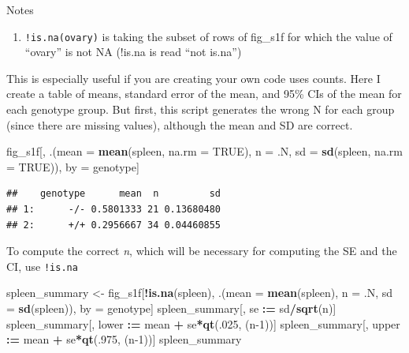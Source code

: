 \documentclass[]{book}
\newenvironment{Shaded}{\begin{snugshade}}{\end{snugshade}}
\newcommand{\DataTypeTok}[1]{\textcolor[rgb]{0.13,0.29,0.53}{#1}}
\newcommand{\DecValTok}[1]{\textcolor[rgb]{0.00,0.00,0.81}{#1}}
\newcommand{\ErrorTok}[1]{\textcolor[rgb]{0.64,0.00,0.00}{\textbf{#1}}}
\newcommand{\KeywordTok}[1]{\textcolor[rgb]{0.13,0.29,0.53}{\textbf{#1}}}
\newcommand{\NormalTok}[1]{#1}
\newcommand{\OperatorTok}[1]{\textcolor[rgb]{0.81,0.36,0.00}{\textbf{#1}}}
\newcommand{\OtherTok}[1]{\textcolor[rgb]{0.56,0.35,0.01}{#1}}
\newcommand{\StringTok}[1]{\textcolor[rgb]{0.31,0.60,0.02}{#1}}
\providecommand{\tightlist}{%
  \setlength{\itemsep}{0pt}\setlength{\parskip}{0pt}}
\begin{document}
Notes

\begin{enumerate}
\def\labelenumi{\arabic{enumi}.}
\tightlist
\item
  \texttt{!is.na(ovary)} is taking the subset of rows of fig\_s1f for which the value of ``ovary'' is not NA (!is.na is read ``not is.na'')
\end{enumerate}

This is especially useful if you are creating your own code uses counts. Here I create a table of means, standard error of the mean, and 95\% CIs of the mean for each genotype group. But first, this script generates the wrong N for each group (since there are missing values), although the mean and SD are correct.

\begin{Shaded}
\begin{Highlighting}[]
\NormalTok{fig_s1f[, .(}\DataTypeTok{mean =} \KeywordTok{mean}\NormalTok{(spleen, }\DataTypeTok{na.rm =} \OtherTok{TRUE}\NormalTok{),}
            \DataTypeTok{n =}\NormalTok{ .N,}
            \DataTypeTok{sd =} \KeywordTok{sd}\NormalTok{(spleen, }\DataTypeTok{na.rm =} \OtherTok{TRUE}\NormalTok{)),}
\NormalTok{        by =}\StringTok{ }\NormalTok{genotype]}
\end{Highlighting}
\end{Shaded}

\begin{verbatim}
##    genotype      mean  n         sd
## 1:      -/- 0.5801333 21 0.13680480
## 2:      +/+ 0.2956667 34 0.04460855
\end{verbatim}

To compute the correct \emph{n}, which will be necessary for computing the SE and the CI, use \texttt{!is.na}

\begin{Shaded}
\begin{Highlighting}[]
\NormalTok{spleen_summary <-}\StringTok{ }\NormalTok{fig_s1f[}\OperatorTok{!}\KeywordTok{is.na}\NormalTok{(spleen), .(}\DataTypeTok{mean =} \KeywordTok{mean}\NormalTok{(spleen),}
            \DataTypeTok{n =}\NormalTok{ .N,}
            \DataTypeTok{sd =} \KeywordTok{sd}\NormalTok{(spleen)),}
\NormalTok{        by =}\StringTok{ }\NormalTok{genotype]}
\NormalTok{spleen_summary[, se }\OperatorTok{:}\ErrorTok{=}\StringTok{ }\NormalTok{sd}\OperatorTok{/}\KeywordTok{sqrt}\NormalTok{(n)]}
\NormalTok{spleen_summary[, lower }\OperatorTok{:}\ErrorTok{=}\StringTok{ }\NormalTok{mean }\OperatorTok{+}\StringTok{ }\NormalTok{se}\OperatorTok{*}\KeywordTok{qt}\NormalTok{(.}\DecValTok{025}\NormalTok{, (n}\DecValTok{-1}\NormalTok{))]}
\NormalTok{spleen_summary[, upper }\OperatorTok{:}\ErrorTok{=}\StringTok{ }\NormalTok{mean }\OperatorTok{+}\StringTok{ }\NormalTok{se}\OperatorTok{*}\KeywordTok{qt}\NormalTok{(.}\DecValTok{975}\NormalTok{, (n}\DecValTok{-1}\NormalTok{))]}
\NormalTok{spleen_summary}
\end{Highlighting}
\end{Shaded}
\end{document}
